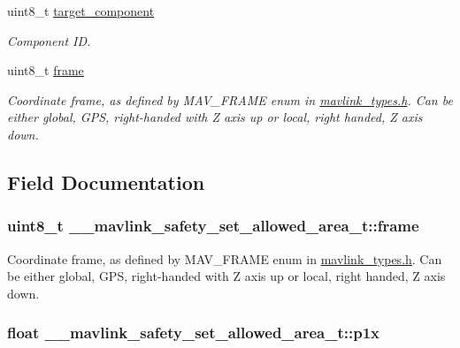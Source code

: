 \begin{DoxyCompactItemize}
uint8\+\_\+t \hyperlink{struct____mavlink__safety__set__allowed__area__t_a4aea287fa77793e6c8c00b5b4f059aa9}{target\+\_\+component}
\begin{DoxyCompactList}\small\item\em Component I\+D. \end{DoxyCompactList}\item 
uint8\+\_\+t \hyperlink{struct____mavlink__safety__set__allowed__area__t_a52d592378bcb6ba92e9eb412bd12b46b}{frame}
\begin{DoxyCompactList}\small\item\em Coordinate frame, as defined by M\+A\+V\+\_\+\+F\+R\+A\+M\+E enum in \hyperlink{mavlink__types_8h}{mavlink\+\_\+types.\+h}. Can be either global, G\+P\+S, right-\/handed with Z axis up or local, right handed, Z axis down. \end{DoxyCompactList}\end{DoxyCompactItemize}


\subsection{Field Documentation}
\hypertarget{struct____mavlink__safety__set__allowed__area__t_a52d592378bcb6ba92e9eb412bd12b46b}{
\subsubsection[{frame}]{\setlength{\rightskip}{0pt plus 5cm}uint8\+\_\+t \+\_\+\+\_\+mavlink\+\_\+safety\+\_\+set\+\_\+allowed\+\_\+area\+\_\+t\+::frame}}\label{struct____mavlink__safety__set__allowed__area__t_a52d592378bcb6ba92e9eb412bd12b46b}


Coordinate frame, as defined by M\+A\+V\+\_\+\+F\+R\+A\+M\+E enum in \hyperlink{mavlink__types_8h}{mavlink\+\_\+types.\+h}. Can be either global, G\+P\+S, right-\/handed with Z axis up or local, right handed, Z axis down. 

\hypertarget{struct____mavlink__safety__set__allowed__area__t_acf2cef0f070243c5e89a64f6f2ca413f}{
\subsubsection[{p1x}]{\setlength{\rightskip}{0pt plus 5cm}float \+\_\+\+\_\+mavlink\+\_\+safety\+\_\+set\+\_\+allowed\+\_\+area\+\_\+t\+::p1x}}\label{struct____mavlink__safety__set__allowed__area__t_acf2cef0f070243c5e89a64f6f2ca413f}



